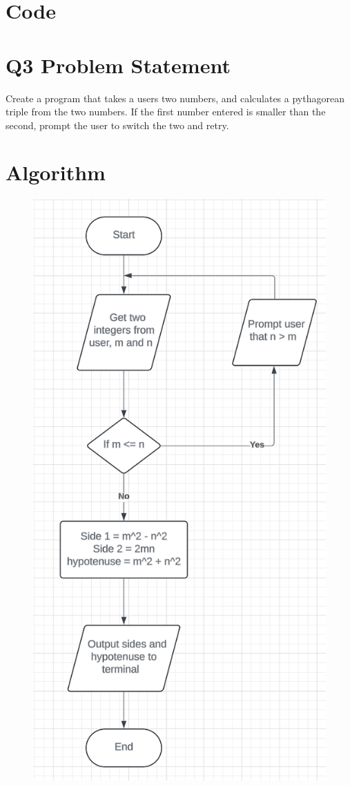 \documentclass{article}
\begin{document}
\begin{flushleft}
	\section{Code}
	
	\newpage
	\section{Q3 Problem Statement}
	Create a program that takes a users two numbers, and calculates a pythagorean triple from the two numbers. If the first number entered is smaller than the second, prompt the user to switch the two and retry.
	\section{Algorithm}
	\begin{figure}[!h]
		\begin{centering}
			\includegraphics[scale=0.45]{Q3flowchart.png}

\end{centering}
\end{figure}
\end{flushleft}
\end{document}
